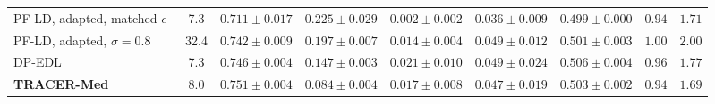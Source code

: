 \documentclass[3p,12pt]{elsarticle}
\theoremstyle{plain}
\theoremstyle{definition}
\begin{document}
\begin{table}[t]
{\begin{tabular}{lcccccccc}
PF-LD, adapted, matched $\epsilon$~\cite{tran2021differentially} & 7.3 & $0.711 \pm 0.017$ & $0.225 \pm 0.029$ & $\mathbf{0.002} \pm \mathbf{0.002}$ & $\mathbf{0.036} \pm \mathbf{0.009}$ & $\mathbf{0.499} \pm \mathbf{0.000}$ & $0.94$ & $1.71$ \\
PF-LD, adapted, $\sigma=0.8$~\cite{tran2021differentially} & 32.4 & $0.742 \pm 0.009$ & $0.197 \pm 0.007$ & $0.014 \pm 0.004$ & $0.049 \pm 0.012$ & $0.501 \pm 0.003$ & $1.00$ & $2.00$ \\
DP-EDL & 7.3 & $0.746 \pm 0.004$ & $0.147 \pm 0.003$ & $0.021 \pm 0.010$ & $0.049 \pm 0.024$ & $0.506 \pm 0.004$ & $0.96$ & $1.77$ \\
\textbf{TRACER-Med} & 8.0 & $\mathbf{0.751} \pm \mathbf{0.004}$ & $\mathbf{0.084} \pm \mathbf{0.004}$ & $0.017 \pm 0.008$ & $0.047 \pm 0.019$ & $0.503 \pm 0.002$ & $0.94$ & $1.69$ \\
\bottomrule
\end{tabular}
}
\end{table}
\end{document}

